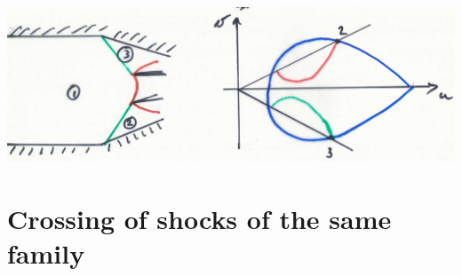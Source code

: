 \begin{center}
\includegraphics[scale=0.2]{ch9/14}
\end{center} 

\section{Crossing of shocks of the same family}
